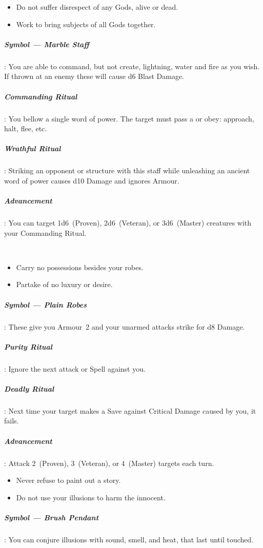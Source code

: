 \documentclass[itdr]{subfiles}
\begin{document}
{\em\begin{itemize}
		\item Do not suffer disrespect of any Gods, alive or dead.
		\item Work to bring subjects of all Gods together.
\end{itemize}}

\subparagraph{Symbol --- Marble Staff}: You are able to command, but not create, lightning, water and fire as you wish. If thrown at an enemy these will cause d6 Blast Damage.

\subparagraph{Commanding Ritual}: You bellow a single word of power. The target must pass a  or obey: approach, halt, flee, etc.

\subparagraph{Wrathful Ritual}: Striking an opponent or structure with this staff while unleashing an ancient word of power causes d10 Damage and ignores Armour.

\subparagraph{Advancement}: You can target 1d6~(Proven), 2d6~(Veteran), or 3d6~(Master) creatures with your Commanding Ritual.

~

{\em\begin{itemize}
		\item Carry no possessions besides your robes.
		\item Partake of no luxury or desire.
\end{itemize}}

\subparagraph{Symbol --- Plain Robes}: These give you Armour~2 and your unarmed attacks strike for d8 Damage.

\subparagraph{Purity Ritual}: Ignore the next attack or Spell against you.

\subparagraph{Deadly Ritual}: Next time your target makes a Save against Critical Damage caused by you, it fails.

\subparagraph{Advancement}: Attack 2~(Proven), 3~(Veteran), or 4~(Master) targets each turn.

\vfill
\break

{\em\begin{itemize}
		\item Never refuse to paint out a story.
		\item Do not use your illusions to harm the innocent.
\end{itemize}}

\subparagraph{Symbol --- Brush Pendant}: You can conjure illusions with sound, smell, and heat, that last until touched.
\end{document}

